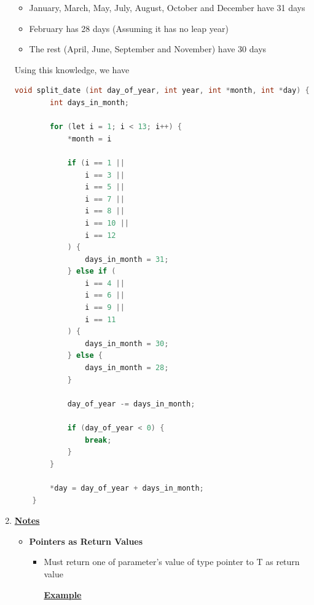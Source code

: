 \documentclass[12pt]{article}
\begin{document}
\begin{enumerate}[1.]
    \begin{itemize}
        \item January, March, May, July, August, October and December have 31 days
        \item February has 28 days (Assuming it has no leap year)
        \item The rest (April, June, September and November) have 30 days
    \end{itemize}

    \bigskip

    Using this knowledge, we have


\begin{lstlisting}[language=c]
    void split_date (int day_of_year, int year, int *month, int *day) {
        int days_in_month;

        for (let i = 1; i < 13; i++) {
            *month = i

            if (i == 1 ||
                i == 3 ||
                i == 5 ||
                i == 7 ||
                i == 8 ||
                i == 10 ||
                i == 12
            ) {
                days_in_month = 31;
            } else if (
                i == 4 ||
                i == 6 ||
                i == 9 ||
                i == 11
            ) {
                days_in_month = 30;
            } else {
                days_in_month = 28;
            }

            day_of_year -= days_in_month;

            if (day_of_year < 0) {
                break;
            }
        }

        *day = day_of_year + days_in_month;
    }
\end{lstlisting}

    \item

    \bigskip

    \underline{\textbf{Notes}}

    \begin{itemize}
        \item \textbf{Pointers as Return Values}

        \begin{itemize}
            \item Must return one of parameter's value of type pointer to T as return value

            \bigskip

            \underline{\textbf{Example}}


\end{itemize}
\end{itemize}
\end{enumerate}
\end{document}
